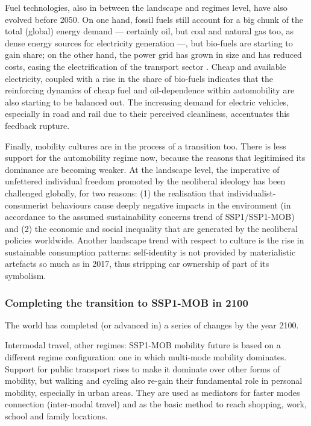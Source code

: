 Fuel technologies, also in between the landscape and regimes level, have also evolved before 2050. On one hand, fossil fuels still account for a big chunk of the total (global) energy demand --- certainly oil, but coal and natural gas too, as dense energy sources for electricity generation ---, but bio-fuels are starting to gain share; on the other hand, the power grid has grown in size and has reduced costs, easing the electrification of the transport sector \parencite{vuuren2017_Energylanduse}. Cheap and available electricity, coupled with a rise in the share of bio-fuels indicates that the reinforcing dynamics of cheap fuel and oil-dependence within automobility are also starting to be balanced out. The increasing demand for electric vehicles, especially in road and rail due to their perceived cleanliness, accentuates this feedback rupture.

Finally, mobility cultures are in the process of a transition too. There is less support for the automobility regime now, because the reasons that legitimised its dominance are becoming weaker. At the landscape level, the imperative of unfettered individual freedom promoted by the neoliberal ideology has been challenged globally, for two reasons: (1) the realisation that individualist-consumerist behaviours cause deeply negative impacts in the environment (in accordance to the assumed sustainability concerns trend of SSP1/SSP1-MOB) and (2) the economic and social inequality that are generated by the neoliberal policies worldwide. Another landscape trend with respect to culture is the rise in sustainable consumption patterns: self-identity is not provided by materialistic artefacts so much as in 2017, thus stripping car ownership of part of its symbolism.

\subsubsection*{Completing the transition to SSP1-MOB in 2100}
The world has completed (or advanced in) a series of changes by the year 2100. 

Intermodal travel, other regimes: SSP1-MOB mobility future is based on a different regime configuration: one in which multi-mode mobility dominates. Support for public transport rises to make it dominate over other forms of mobility, but walking and cycling also re-gain their fundamental role in personal mobility, especially in urban areas. They are used as mediators for faster modes connection (inter-modal travel) and as the basic method to reach shopping, work, school and family locations.

